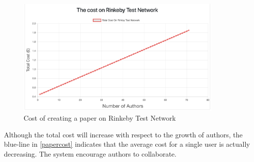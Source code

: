 \documentclass[openany,12pt]{ecsthesis}      %
\begin{document}
\begin{figure}[H]
  \centering
  \includegraphics[width=0.9\textwidth]{apapercost.png}
  \caption{Cost of creating a paper on Rinkeby Test Network}
  \label{creatingpaper} 
\end{figure}
Although the total cost will increase with respect to the growth of authors, 
the blue-line in \ref{papercost} indicates that the average cost for a single user is actually decreasing.
The system encourage authors to collaborate.
\end{document}
